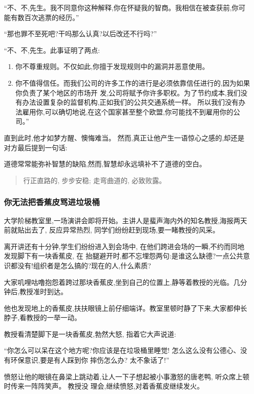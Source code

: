 \documentclass[11pt]{article}
\begin{document}
``不、不,先生。我不同意你这种解释,你在怀疑我的智商。我相信在被查获前,你可能有数百次逃票的经历。'' 

``那也罪不至死吧?干吗那么认真?以后改还不行吗?'' 

``不、不,先生。此事证明了两点: 

\begin{enumerate}
 \item 你不尊重规则。不仅如此,你擅于发现规则中的漏洞并恶意使用。 

 \item 你不值得信任。而我们公司的许多工作的进行是必须依靠信任进行的,因为如果你负责了某个地区的市场开
   发,公司将赋予你许多职权。为了节约成本,我们没有办法设置复杂的监督机构,正如我们的公共交通系统一样。
   所以我们没有办法雇用你,可以确切地说,在这个国家甚至整个欧盟,你可能找不到雇用你的公司。''
\end{enumerate}

直到此时,他才如梦方醒、懊悔难当。 然而,真正让他产生一语惊心之感的,却还是对方最后提到一句话: 

道德常常能弥补智慧的缺陷,然而,智慧却永远填补不了道德的空白。

\begin{quote}
行正直路的, 步步安稳;
走弯曲道的, 必致败露。
\end{quote}
 
\subsubsection{你无法把香蕉皮骂进垃圾桶}
 
大学阶梯教室里,一场演讲会即将开始。主讲人是蜚声海内外的知名教授,海报两天前就贴出去了, 反应异常热烈,
同学们纷纷赶到现场,要一睹教授的风采。
 
离开讲还有十分钟,学生们纷纷进入到会场中, 在他们跨进会场的一瞬,不约而同地发现脚下有一块香蕉皮, 在
抬腿避开时,都不忘埋怨两句:是谁这么缺德?一点公共意识都没有!组织者是怎么搞的?现在的人,什么素质?
 
大家叽哩咕噜抱怨着跨过那块香蕉皮,坐到自己的位置上,静等着教授的光临。几分钟后,教授准时到达。
 
他也发现地上的香蕉皮,扶扶眼镜上前仔细端详。教室里顿时静了下来,大家都伸长脖子,看教授的一举一动。
 
教授看清楚脚下是一块香蕉皮,勃然大怒, 指着它大声说道:

``你怎么可以呆在这个地方呢?你应该是在垃圾桶里睡觉! 怎么这么没有公德心、没有环保意识,要是有人踩到你
摔伤怎么办? 太不象话了!''
 
愤怒让他的眼镜在鼻梁上跳动着,让人一下子想起被小事激怒的唐老鸭, 听众席上顿时传来一阵阵笑声。 教授没
理会,继续愤怒,对着香蕉皮继续发火。
 
\end{document}
